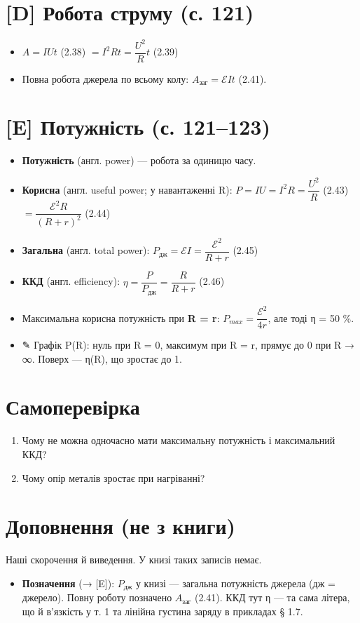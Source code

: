 \documentclass[11pt,a4paper,oneside]{book}
\newcommand{\pen}{{\sffamily\color{accent}✎}}
\begin{document}
\section*{[D] Робота струму (с. 121)}
\begin{itemize}
\item $A = IUt$ (2.38) $= I^2Rt = \dfrac{U^2}{R}t$ (2.39)
\item Повна робота джерела по всьому колу: $A_{\text{заг}} = \mathcal E It$ (2.41).
\end{itemize}

\section*{[E] Потужність (с. 121–123)}
\begin{itemize}
\item \textbf{Потужність} (англ. power) — робота за одиницю часу.
\item \textbf{Корисна} (англ. useful power; у навантаженні R): $P = IU = I^2R = \dfrac{U^2}{R}$ (2.43) $= \dfrac{\mathcal E^2R}{(R+r)^2}$ (2.44)
\item \textbf{Загальна} (англ. total power): $P_{\text{дж}} = \mathcal EI = \dfrac{\mathcal E^2}{R+r}$ (2.45)
\item \textbf{ККД} (англ. efficiency): $\eta = \dfrac{P}{P_{\text{дж}}} = \dfrac{R}{R+r}$ (2.46)
\item Максимальна корисна потужність при \textbf{R = r}: $P_{max} = \dfrac{\mathcal E^2}{4r}$, але тоді η = 50 \%.
\item \pen{} Графік P(R): нуль при R = 0, максимум при R = r, прямує до 0 при R → ∞. Поверх — η(R), що зростає до 1.
\end{itemize}

\section*{Самоперевірка}
\begin{enumerate}
\item Чому не можна одночасно мати максимальну потужність і максимальний ККД?
\item Чому опір металів зростає при нагріванні?
\end{enumerate}

\section*{Доповнення (не з книги)}
Наші скорочення й виведення. У книзі таких записів немає.
\begin{itemize}
\item \textbf{Позначення} (→ [E]): $P_{\text{дж}}$ у книзі — загальна потужність джерела (дж = джерело). Повну роботу позначено $A_{\text{заг}}$ (2.41). ККД тут η — та сама літера, що й в'язкість у т. 1 та лінійна густина заряду в прикладах § 1.7.
\end{itemize}
\end{document}
